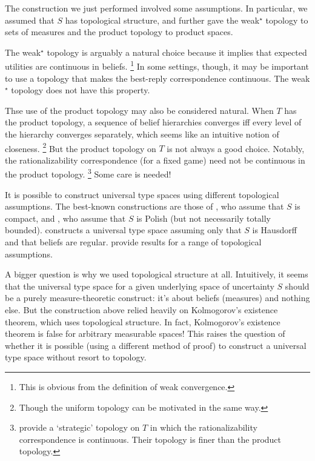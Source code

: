 \documentclass[11pt,letterpaper,reqno,oneside]{article}
\begin{document}
The construction we just performed involved some assumptions. In particular, we assumed that $S$ has topological structure, and further gave the weak$^\star$ topology to sets of measures and the product topology to product spaces.

The weak$^\star$ topology is arguably a natural choice because it implies that expected utilities are continuous in beliefs.%
	\footnote{This is obvious from the definition of weak convergence.}
In some settings, though, it may be important to use a topology that makes the best-reply correspondence continuous. The weak$^\star$ topology does not have this property.

Thse use of the product topology may also be considered natural. When $T$ has the product topology, a sequence of belief hierarchies converges iff every level of the hierarchy converges separately, which seems like an intuitive notion of closeness.%
	\footnote{Though the uniform topology can be motivated in the same way.}
But the product topology on $T$ is not always a good choice. Notably, the rationalizability correspondence (for a fixed game) need not be continuous in the product topology.%
	\footnote{\textcite{DekelFudenbergMorris2006} provide a `strategic' topology on $T$ in which the rationalizability correspondence is continuous. Their topology is finer than the product topology.}
Some care is needed!

It is possible to construct universal type spaces using different topological assumptions. The best-known constructions are those of \textcite{MertensZamir1985}, who assume that $S$ is compact, and \textcite{BrandenburgerDekel1993}, who assume that $S$ is Polish (but not necessarily totally bounded). \textcite{Heifetz1993} constructs a universal type space assuming only that $S$ is Hausdorff and that beliefs are regular. \textcite[][ch. III]{MertensSorinZamir2015} provide results for a range of topological assumptions.


A bigger question is why we used topological structure at all. Intuitively, it seems that the universal type space for a given underlying space of uncertainty $S$ should be a purely measure-theoretic construct: it's about beliefs (measures) and nothing else. But the construction above relied heavily on Kolmogorov's existence theorem, which uses topological structure. In fact, Kolmogorov's existence theorem is false for arbitrary measurable spaces! This raises the question of whether it is possible (using a different method of proof) to construct a universal type space without resort to topology.
\end{document}
